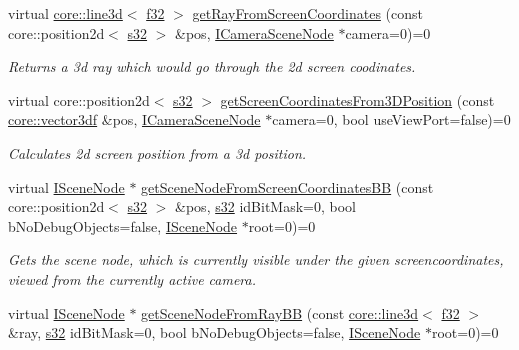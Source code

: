 \begin{DoxyCompactItemize}
virtual \hyperlink{classirr_1_1core_1_1line3d}{core\+::line3d}$<$ \hyperlink{namespaceirr_a0277be98d67dc26ff93b1a6a1d086b07}{f32} $>$ \hyperlink{classirr_1_1scene_1_1ISceneCollisionManager_adb95809ed422e138405f30844740666b}{get\+Ray\+From\+Screen\+Coordinates} (const core\+::position2d$<$ \hyperlink{namespaceirr_ac66849b7a6ed16e30ebede579f9b47c6}{s32} $>$ \&pos, \hyperlink{classirr_1_1scene_1_1ICameraSceneNode}{I\+Camera\+Scene\+Node} $\ast$camera=0)=0
\begin{DoxyCompactList}\small\item\em Returns a 3d ray which would go through the 2d screen coodinates. \end{DoxyCompactList}\item 
virtual core\+::position2d$<$ \hyperlink{namespaceirr_ac66849b7a6ed16e30ebede579f9b47c6}{s32} $>$ \hyperlink{classirr_1_1scene_1_1ISceneCollisionManager_a6032377ff769e42c3e28547794f015ea}{get\+Screen\+Coordinates\+From3\+D\+Position} (const \hyperlink{namespaceirr_1_1core_ae6e2b2a6c552833ebbd5b7463d03586b}{core\+::vector3df} \&pos, \hyperlink{classirr_1_1scene_1_1ICameraSceneNode}{I\+Camera\+Scene\+Node} $\ast$camera=0, bool use\+View\+Port=false)=0
\begin{DoxyCompactList}\small\item\em Calculates 2d screen position from a 3d position. \end{DoxyCompactList}\item 
virtual \hyperlink{classirr_1_1scene_1_1ISceneNode}{I\+Scene\+Node} $\ast$ \hyperlink{classirr_1_1scene_1_1ISceneCollisionManager_aca97a47ae237373bbd681268a462f4a0}{get\+Scene\+Node\+From\+Screen\+Coordinates\+BB} (const core\+::position2d$<$ \hyperlink{namespaceirr_ac66849b7a6ed16e30ebede579f9b47c6}{s32} $>$ \&pos, \hyperlink{namespaceirr_ac66849b7a6ed16e30ebede579f9b47c6}{s32} id\+Bit\+Mask=0, bool b\+No\+Debug\+Objects=false, \hyperlink{classirr_1_1scene_1_1ISceneNode}{I\+Scene\+Node} $\ast$root=0)=0
\begin{DoxyCompactList}\small\item\em Gets the scene node, which is currently visible under the given screencoordinates, viewed from the currently active camera. \end{DoxyCompactList}\item 
virtual \hyperlink{classirr_1_1scene_1_1ISceneNode}{I\+Scene\+Node} $\ast$ \hyperlink{classirr_1_1scene_1_1ISceneCollisionManager_a420ffad2d3a8bcd2f51b504cb8709ac6}{get\+Scene\+Node\+From\+Ray\+BB} (const \hyperlink{classirr_1_1core_1_1line3d}{core\+::line3d}$<$ \hyperlink{namespaceirr_a0277be98d67dc26ff93b1a6a1d086b07}{f32} $>$ \&ray, \hyperlink{namespaceirr_ac66849b7a6ed16e30ebede579f9b47c6}{s32} id\+Bit\+Mask=0, bool b\+No\+Debug\+Objects=false, \hyperlink{classirr_1_1scene_1_1ISceneNode}{I\+Scene\+Node} $\ast$root=0)=0

\end{DoxyCompactItemize}
